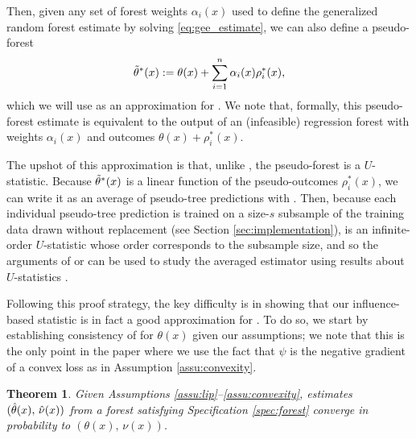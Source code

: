 \documentclass[aos]{imsart}
\theoremstyle{plain}
\newtheorem{theo}[prop]{Theorem}
\theoremstyle{definition}
\theoremstyle{remark}
\begin{document}
\begin{CJK}{UTF8}{gbsn}
Then, given any set of forest weights $\alpha_i(x)$ used to define the generalized random forest
estimate  by solving \eqref{eq:gee_estimate}, we can also define a
pseudo-forest
\begin{equation}
\label{eq:pseudo_forest}
\ttheta^*(x) := \theta(x) + \sum_{i = 1}^n \alpha_i(x) \rho_i^*(x),
\end{equation}
which we will use as an approximation for  . We note that,
formally, this pseudo-forest estimate  is equivalent to the output of an (infeasible)
regression forest with weights $\alpha_i(x)$ and outcomes $\theta(x) + \rho_i^*(x)$.

The upshot of this approximation is that, unlike , the pseudo-forest
 is a $U$-statistic.
Because $\tilde{\theta}^*(x)$ is a linear function of the pseudo-outcomes $\rho_i^*(x)$,
we can write it as an average of pseudo-tree predictions
 with
.
Then, because each individual pseudo-tree prediction  is trained on a size-$s$ subsample
of the training data drawn without replacement (see Section \ref{sec:implementation}), 
 is an infinite-order $U$-statistic whose order corresponds to the subsample size,
and so the arguments of \citet{mentch2016quantifying} or \citet{wager2015estimation} can be used to study the averaged estimator
 using results about $U$-statistics \citep{hoeffding1948class,efron1981jackknife}.

Following this proof strategy, the key difficulty is in showing that our influence-based statistic
 is in fact a good approximation for .
To do so, we start by establishing consistency of  for $\theta(x)$ given
our assumptions; we note that this is the only point in the paper where we use the fact that
$\psi$ is the negative gradient of a convex loss as in Assumption \ref{assu:convexity}.

\begin{theo}
\label{theo:consistency}
Given Assumptions \ref{assu:lip}--\ref{assu:convexity},
estimates $(\hat{\theta}(x), \, \hat{\nu}(x))$ from a 
forest satisfying Specification \ref{spec:forest}
converge in probability to $(\theta(x), \, \nu(x))$.
\end{theo}


\end{CJK}
\end{document}
